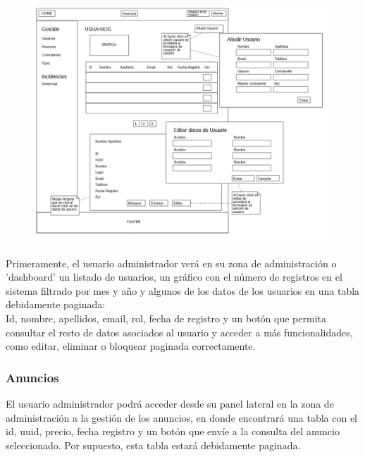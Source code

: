 \begin{figure}[h!]
\centering
\includegraphics[width=1\textwidth]{Img/VisionAplicacion/vision_8.jpg}
\end{figure}

Primeramente, el usuario administrador ver\'{a} en su zona de administraci\'{o}n o 'dashboard' un listado de usuarios, un gr\'{a}fico con el n\'{u}mero de registros en el sistema filtrado por mes y a\~{n}o y algunos de los datos de los usuarios en una tabla debidamente paginada: \\

Id, nombre, apellidos, email, rol, fecha de registro y un bot\'{o}n que permita consultar el resto de datos asociados al usuario y acceder a m\'{a}s funcionalidades, como editar, eliminar o bloquear paginada correctamente.


\pagebreak

\subsubsection{Anuncios}
El usuario administrador podr\'{a} acceder desde su panel lateral en la zona de administraci\'{o}n a la gesti\'{o}n de los anuncios, en donde encontrar\'{a} una tabla con el id, uuid, precio, fecha registro y un bot\'{o}n que env\'{i}e a la consulta del anuncio seleccionado. Por supuesto, esta tabla estar\'{a} debidamente paginada.



